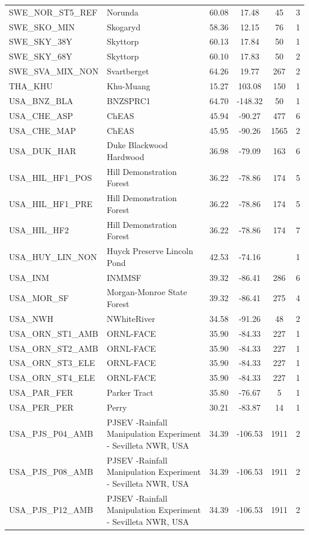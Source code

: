 \documentclass[11pt,twoside]{reedthesis}
\begin{document}
\begin{longtable}[t]{l>{\centering\arraybackslash}p{12em}cccc}
SWE\_NOR\_ST5\_REF & Norunda & 60.08 & 17.48 & 45 & 3\\
SWE\_SKO\_MIN & Skogaryd & 58.36 & 12.15 & 76 & 1\\
SWE\_SKY\_38Y & Skyttorp & 60.13 & 17.84 & 50 & 1\\
SWE\_SKY\_68Y & Skyttorp & 60.10 & 17.83 & 50 & 2\\
SWE\_SVA\_MIX\_NON & Svartberget & 64.26 & 19.77 & 267 & 2\\
THA\_KHU & Khu-Muang & 15.27 & 103.08 & 150 & 1\\
USA\_BNZ\_BLA & BNZSPRC1 & 64.70 & -148.32 & 50 & 1\\
USA\_CHE\_ASP & ChEAS & 45.94 & -90.27 & 477 & 6\\
USA\_CHE\_MAP & ChEAS & 45.95 & -90.26 & 1565 & 2\\
USA\_DUK\_HAR & Duke Blackwood Hardwood & 36.98 & -79.09 & 163 & 6\\
USA\_HIL\_HF1\_POS & Hill Demonstration Forest & 36.22 & -78.86 & 174 & 5\\
USA\_HIL\_HF1\_PRE & Hill Demonstration Forest & 36.22 & -78.86 & 174 & 5\\
USA\_HIL\_HF2 & Hill Demonstration Forest & 36.22 & -78.86 & 174 & 7\\
USA\_HUY\_LIN\_NON & Huyck Preserve  Lincoln Pond & 42.53 & -74.16 &  & 1\\
USA\_INM & INMMSF & 39.32 & -86.41 & 286 & 6\\
USA\_MOR\_SF & Morgan-Monroe State Forest & 39.32 & -86.41 & 275 & 4\\
USA\_NWH & NWhiteRiver & 34.58 & -91.26 & 48 & 2\\
USA\_ORN\_ST1\_AMB & ORNL-FACE & 35.90 & -84.33 & 227 & 1\\
USA\_ORN\_ST2\_AMB & ORNL-FACE & 35.90 & -84.33 & 227 & 1\\
USA\_ORN\_ST3\_ELE & ORNL-FACE & 35.90 & -84.33 & 227 & 1\\
USA\_ORN\_ST4\_ELE & ORNL-FACE & 35.90 & -84.33 & 227 & 1\\
USA\_PAR\_FER & Parker Tract & 35.80 & -76.67 & 5 & 1\\
USA\_PER\_PER & Perry & 30.21 & -83.87 & 14 & 1\\
USA\_PJS\_P04\_AMB & PJSEV -Rainfall Manipulation Experiment - Sevilleta NWR, USA & 34.39 & -106.53 & 1911 & 2\\
USA\_PJS\_P08\_AMB & PJSEV -Rainfall Manipulation Experiment - Sevilleta NWR, USA & 34.39 & -106.53 & 1911 & 2\\
USA\_PJS\_P12\_AMB & PJSEV -Rainfall Manipulation Experiment - Sevilleta NWR, USA & 34.39 & -106.53 & 1911 & 2\\

\end{longtable}
\end{document}
